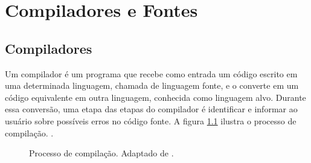 \chapter{Compiladores e Fontes}

\section{Compiladores}




Um compilador é um programa que recebe como entrada um código escrito em uma determinada linguagem, chamada de linguagem fonte, e o converte em um código equivalente em outra linguagem, conhecida como linguagem alvo. Durante essa conversão, uma etapa das etapas do compilador é identificar e informar ao usuário sobre possíveis erros no código fonte. A figura \ref{fig:compilador} ilustra o processo de compilação.
\cite{aho1977principles}.

\begin{figure}[h]
	\centering


	\caption{Processo de compilação. Adaptado de \cite{aho1977principles}.}
	\label{fig:compilador}
\end{figure}

